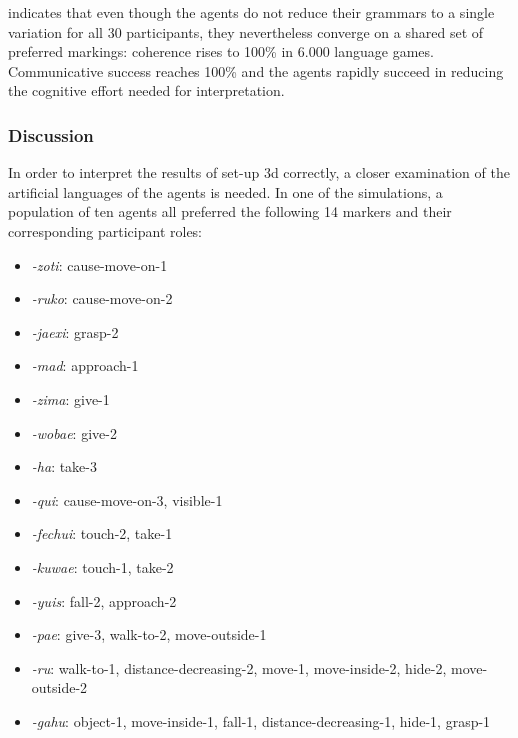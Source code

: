 \largerpage
{} indicates that even though the agents do not reduce their grammars to a single variation for all 30 participants, they nevertheless converge on a shared set of preferred markings: coherence rises to 100\% in 6.000 language games. Communicative success reaches 100\% and the agents rapidly succeed in reducing the cognitive effort needed for interpretation. 


\subsubsection{Discussion}
 In order to interpret the results of set-up 3d correctly, a closer examination of the artificial languages of the agents is needed. In one of the simulations, a population of ten agents all preferred the following 14 markers and their corresponding participant roles:

\begin{itemize}
\item {\em -zoti}: cause-move-on-1
\item {\em -ruko}: cause-move-on-2
\item {\em -jaexi}: grasp-2
\item {\em -mad}: approach-1
\item {\em -zima}: give-1
\item {\em -wobae}: give-2
\item {\em -ha}: take-3
\item {\em -qui}: cause-move-on-3, visible-1
\item {\em -fechui}: touch-2, take-1
\item {\em -kuwae}: touch-1, take-2
\item {\em -yuis}: fall-2, approach-2
\item {\em -pae}: give-3, walk-to-2, move-outside-1
\item {\em -ru}: walk-to-1, distance-decreasing-2, move-1, move-inside-2, hide-2, move-outside-2
\item {\em -gahu}: object-1, move-inside-1, fall-1, distance-decreasing-1, hide-1, grasp-1
\end{itemize}

